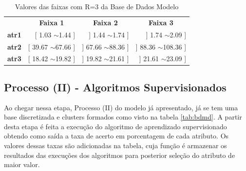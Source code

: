 \begin{table}[]
\centering
\caption{Valores das faixas com R=3 da Base de Dados Modelo}
\label{tab:faixas}
\begin{tabular}{lrrr}
\rowcolor[HTML]{C0C0C0} 
                                     & \multicolumn{1}{c}{\cellcolor[HTML]{C0C0C0}\textbf{Faixa 1}} & \multicolumn{1}{c}{\cellcolor[HTML]{C0C0C0}\textbf{Faixa 2}} & \multicolumn{1}{c}{\cellcolor[HTML]{C0C0C0}\textbf{Faixa 3}} \\
\rowcolor[HTML]{FFFFFF} 
{\color[HTML]{333333} \textbf{atr1}} & {[} 1.03 $\sim$1.44 {]}                                      & {]} 1.44 $\sim$1.74 {]}                                      & {]} 1.74 $\sim$2.09 {]}                                      \\
\rowcolor[HTML]{EFEFEF} 
{\color[HTML]{000000} \textbf{atr2}} & {\color[HTML]{000000} {[} 39.67 $\sim$67.66 {]}}             & {\color[HTML]{000000} {]} 67.66 $\sim$88.36 {]}}             & {\color[HTML]{000000} {]} 88.36 $\sim$108.36 {]}}            \\
\rowcolor[HTML]{FFFFFF} 
\textbf{atr3}                        & {[} 18.42 $\sim$19.82 {]}                                    & {]} 19.82 $\sim$21.61 {]}                                    & {]} 21.61 $\sim$23.09 {]}                                   
\end{tabular}
\end{table}



\subsection{Processo (II) - Algoritmos Supervisionados}\label{cap:ferramentas:ssec:algsuper}

Ao chegar nessa etapa, Processo (II) do modelo já apresentado, já se tem uma base discretizada e clusters formados como visto na tabela \ref{tab:bdmd}. A partir desta etapa é feita a execução do algoritmo de aprendizado supervisionado obtendo como saída a taxa de acerto em porcentagem de cada atributo. Os valores dessas taxas  são adicionadas na tabela, cuja função é armazenar os resultados das execuções dos algoritmos para posterior seleção do atributo de maior valor.


